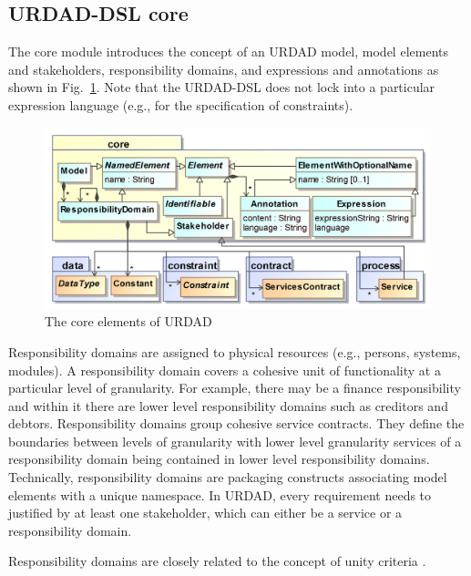 
\subsection{URDAD-DSL core}

The core module introduces the concept of an URDAD model, model elements and stakeholders, responsibility domains, and expressions and annotations as shown in Fig.\ \ref{fig:metamodel}. Note that the URDAD-DSL does not lock into a particular expression language (e.g., for the specification of constraints). 

\begin{figure}[Htb]
  \centering
  \includegraphics{core}
  \caption{The core elements of URDAD}
  \label{fig:metamodel}
\end{figure}

Responsibility domains are assigned to physical resources (e.g., persons, systems, modules). A responsibility domain covers a cohesive unit of functionality at a particular level of granularity. For example, there may be a finance responsibility and within it there are lower level responsibility domains such as creditors and debtors. Responsibility domains group cohesive service contracts. They define the boundaries between levels of granularity with lower level granularity services of a responsibility domain being contained in lower level responsibility domains. Technically, responsibility domains are packaging constructs associating model elements with a unique namespace. In URDAD, every requirement needs to justified by at least one stakeholder, which can either be a service or a responsibility domain.

Responsibility domains are closely related to the concept of unity criteria \cite{gonzalez_unity_2009}.

